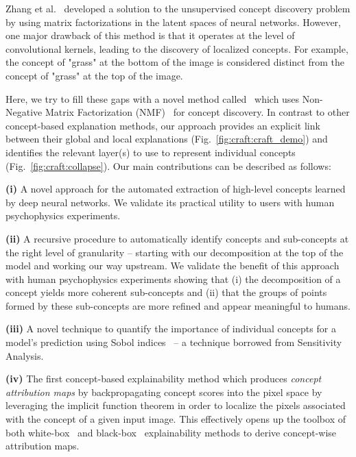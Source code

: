 Zhang et al.~\cite{zhang2021invertible} developed a solution to the unsupervised concept discovery problem by using matrix factorizations in the latent spaces of neural networks. However, one major drawback of this method is that it operates at the level of convolutional kernels, leading to the discovery of localized concepts. For example, the concept of "grass" at the bottom of the image is considered distinct from the concept of "grass" at the top of the image.


Here, we try to fill these gaps with a novel method called \craft~which uses Non-Negative Matrix Factorization (NMF)~\cite{lee1999learning} for concept discovery. In contrast to other concept-based explanation methods, our approach provides an explicit link between their global and local explanations (Fig.~\ref{fig:craft:craft_demo}) and identifies the relevant layer(s) to use to represent individual concepts (Fig.~\ref{fig:craft:collapse}). Our main contributions can be described as follows:

{\textbf{(i)}} A novel approach for the automated extraction of high-level concepts learned by deep neural networks. We validate its practical utility to users with human psychophysics experiments.

{\textbf{(ii)}} A recursive procedure to automatically identify concepts and sub-concepts at the right level of granularity -- starting with our decomposition at the top of the model and working our way upstream. We validate the benefit of this approach with human psychophysics experiments showing that (i) the decomposition of a concept yields more coherent sub-concepts and (ii) that the groups of points formed by these sub-concepts are more refined and appear meaningful to humans.

{\textbf{(iii)}} A novel technique to quantify the importance of individual concepts for a model's prediction using Sobol indices~\cite{sobol1993sensitivity,da2013efficient,sobol2001,sobol2005global,saltelli2002} -- a technique borrowed from Sensitivity Analysis.

{\textbf{(iv)}} The first concept-based explainability method which produces  \textit{concept attribution maps} by backpropagating  concept scores  into the pixel space by leveraging the implicit function theorem in order to localize the pixels associated with the concept of a given input image. This effectively opens up the toolbox of both white-box~\cite{smilkov2017smoothgrad, zeiler2014visualizing, sundararajan2017axiomatic, selvaraju2017gradcam, springenberg2014striving, eva2} and black-box~\cite{ribeiro2016lime, lundberg2017unified, petsiuk2018rise, fel2021sobol} explainability methods to derive concept-wise attribution maps.


